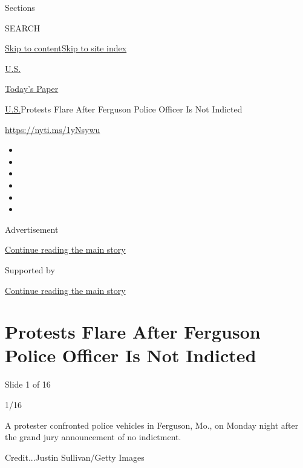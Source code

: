 Sections

SEARCH

\protect\hyperlink{site-content}{Skip to
content}\protect\hyperlink{site-index}{Skip to site index}

\href{https://www.nytimes.com/section/us}{U.S.}

\href{https://myaccount.nytimes.com/auth/login?response_type=cookie\&client_id=vi}{}

\href{https://www.nytimes.com/section/todayspaper}{Today's Paper}

\href{/section/us}{U.S.}\textbar{}Protests Flare After Ferguson Police
Officer Is Not Indicted

\url{https://nyti.ms/1yNsywu}

\begin{itemize}
\item
\item
\item
\item
\item
\item
\end{itemize}

Advertisement

\protect\hyperlink{after-top}{Continue reading the main story}

Supported by

\protect\hyperlink{after-sponsor}{Continue reading the main story}

\hypertarget{protests-flare-after-ferguson-police-officer-is-not-indicted}{%
\section{Protests Flare After Ferguson Police Officer Is Not
Indicted}\label{protests-flare-after-ferguson-police-officer-is-not-indicted}}

Slide 1 of 16

1/16

A protester confronted police vehicles in Ferguson, Mo., on Monday night
after the grand jury announcement of no indictment.

Credit...Justin Sullivan/Getty Images

